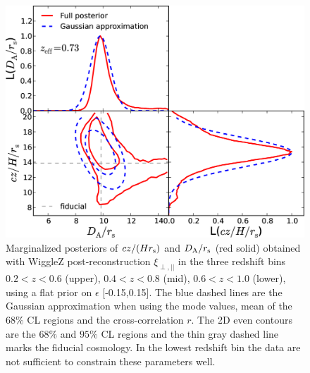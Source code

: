 \documentclass[a4paper,fleqn,usenatbib]{mnras}
\begin{document}
\begin{figure}
\begin{center}
\includegraphics[width=0.9\columnwidth]{stacked_L2D_rpt_wedges_postRec_T015_WiggleZ_z0pt6_1pt0.png}
\caption{ Marginalized posteriors of $cz/(Hr_{\rm s})$ and $D_{\rm A}/r_{\rm s}$ (red solid) obtained with WiggleZ post-reconstruction $\xi_{\perp, ||}$ in the three redshift bins $0.2<z<0.6$ (upper), $0.4<z<0.8$ (mid), $0.6<z<1.0$ (lower), using a flat prior on $\epsilon$ [-0.15,0.15].  The blue dashed lines are the Gaussian approximation when using the mode values, mean of the 68$\%$ CL regions and the cross-correlation $r$. The 2D even contours are the $68\%$ and $95\%$ CL regions and the thin gray dashed line marks the fiducial cosmology.  In the lowest redshift bin the data are not sufficient to constrain these parameters well.}
\label{fig:HDA_z26_epsilon0.15}
\end{center}
\end{figure}
\end{document}
